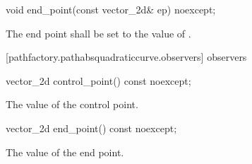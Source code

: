 \begin{itemdecl}
    void end_point(const vector_2d& ep) noexcept;
\end{itemdecl}
\begin{itemdescr}
	\pnum
	\effects
	The end point shall be set to the value of .
\end{itemdescr}

 [pathfactory.pathabsquadraticcurve.observers]{ observers}

\begin{itemdecl}
    vector_2d control_point() const noexcept;
\end{itemdecl}
\begin{itemdescr}
	\pnum
	\returns
	The value of the control point.
\end{itemdescr}

\begin{itemdecl}
    vector_2d end_point() const noexcept;
\end{itemdecl}
\begin{itemdescr}
	\pnum
	\returns
	The value of the end point.
\end{itemdescr}
